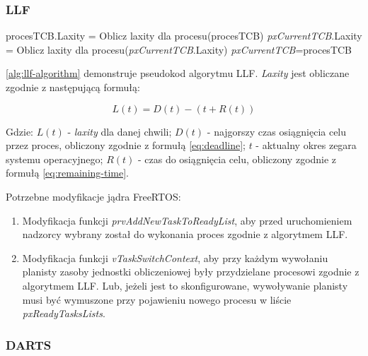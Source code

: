 \documentclass[../../main]{subfiles}
\begin{document}
\subsubsection{LLF}

\begin{algorithm}
\caption{Pseudokod algorytmu LLF}\label{alg:llf-algorithm}
\begin{algorithmic}[1]
    \State procesTCB.Laxity = Oblicz laxity dla procesu(procesTCB)
    \State \textit{pxCurrentTCB}.Laxity = Oblicz laxity dla procesu(\textit{pxCurrentTCB}.Laxity)
        \State \textit{pxCurrentTCB}=procesTCB
    \EndIf
\EndFor
\end{algorithmic}
\end{algorithm}

\cref{alg:llf-algorithm} demonstruje pseudokod algorytmu LLF. \textit{Laxity} jest obliczane zgodnie z następującą formułą:

\large
\begin{equation}
    L(t)=D(t)-(t+R(t))
    \label{eq:laxity}
\end{equation}
\normalsize

Gdzie: $L(t)$ - \textit{laxity} dla danej chwili; $D(t)$ - najgorszy czas osiągnięcia celu przez proces, obliczony zgodnie z formułą \eqref{eq:deadline}; $t$ - aktualny okres zegara systemu operacyjnego; $R(t)$ - czas do osiągnięcia celu, obliczony zgodnie z formułą \eqref{eq:remaining-time}.

Potrzebne modyfikacje jądra FreeRTOS:

\begin{enumerate}
    \item Modyfikacja funkcji \textit{prvAddNewTaskToReadyList}, aby przed uruchomieniem nadzorcy wybrany został do wykonania proces zgodnie z algorytmem LLF.
    \item Modyfikacja funkcji \textit{vTaskSwitchContext}, aby przy każdym wywołaniu planisty zasoby jednostki obliczeniowej były przydzielane procesowi zgodnie z algorytmem LLF. Lub, jeżeli jest to skonfigurowane, wywoływanie planisty musi być wymuszone przy pojawieniu nowego procesu w liście \textit{pxReadyTasksLists}. 
\end{enumerate}

\subsubsection{DARTS}
\end{document}
